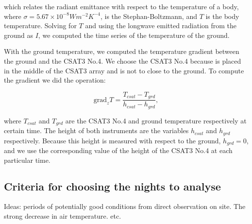 \noindent which relates the radiant emittance with respect to the temperature of a body, where $\sigma = 5.67 \times 10^{-8} W m^{-2} K^{-4}$, is the Stephan-Boltzmann, and $T$ is the body temperature. Solving for $T$ and using the longwave emitted radiation from the ground as $I$, we computed the time series of the temperature of the ground.

With the ground temperature, we computed the temperature gradient between the ground and the CSAT3 No.4. We choose the CSAT3 No.4 because is placed in the middle of the CSAT3 array and is not to close to the ground. To compute the gradient we did the operation:

\begin{equation}
    \text{grad}_z T = \frac{T_{csat} - T_{grd}}{h_{csat} - h_{grd}},
\end{equation}

\noindent where $T_{csat}$ and $T_{grd}$ are the CSAT3 No.4 and ground temperature respectively at certain time. The height of both instruments are the variables $h_{csat}$ and $h_{grd}$ respectively. Because this height is measured with respect to the ground, $h_{grd} = 0$, and we use the corresponding value of the height of the CSAT3 No.4 at each particular time. 

\subsection{Criteria for choosing the nights to analyse}

Ideas: periods of potentially good conditions from direct observation on site. The strong decrease in air temperature. etc. 